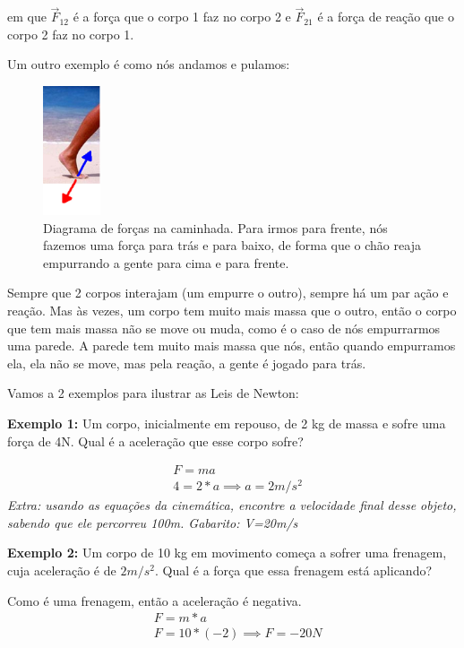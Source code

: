 \documentclass[12pt]{extarticle}
\newcommand{\<}{\langle}
\renewcommand{\>}{\rangle}
\theoremstyle{definition}
\begin{document}
\begin{itemize}
    \noindent em que $\Vec{F}_{12}$ é a força que o corpo 1 faz no corpo 2 e $\Vec{F}_{21}$ é a força de reação que o corpo 2 faz no corpo 1.
    
    Um outro exemplo é como nós andamos e pulamos:
    
    \begin{figure}[H]
        \centering
        \includegraphics[width=0.15\textwidth]{caminhado-sobre-a-areia.jpg}
        \caption{Diagrama de forças na caminhada. Para irmos para frente, nós fazemos uma força para trás e para baixo, de forma que o chão reaja empurrando a gente para cima e para frente.}
        \label{fig:walk}
    \end{figure}
    
    Sempre que 2 corpos interajam (um empurre o outro), sempre há um par ação e reação. Mas às vezes, um corpo tem muito mais massa que o outro, então o corpo que tem mais massa não se move ou muda, como é o caso de nós empurrarmos uma parede. A parede tem muito mais massa que nós, então quando empurramos ela, ela não se move, mas pela reação, a gente é jogado para trás.
    
\end{itemize}

Vamos a 2 exemplos para ilustrar as Leis de Newton:

\textbf{Exemplo 1:} Um corpo, inicialmente em repouso, de 2 kg de massa e sofre uma força de 4N. Qual é a aceleração que esse corpo sofre?

\begin{align*}
    &F = ma\\
    &4 = 2*a \implies a = 2 m/s^2
\end{align*}
\textit{Extra: usando as equações da cinemática, encontre a velocidade final desse objeto, sabendo que ele percorreu 100m. Gabarito: V=20m/s}

\textbf{Exemplo 2:} Um corpo de 10 kg em movimento começa a sofrer uma frenagem, cuja aceleração é de $2 m/s^2$. Qual é a força que essa frenagem está aplicando?

Como é uma frenagem, então a aceleração é negativa.
\begin{align*}
    &F = m*a \\
    &F = 10*(-2) \implies F = -20 N
\end{align*}
\end{document}
